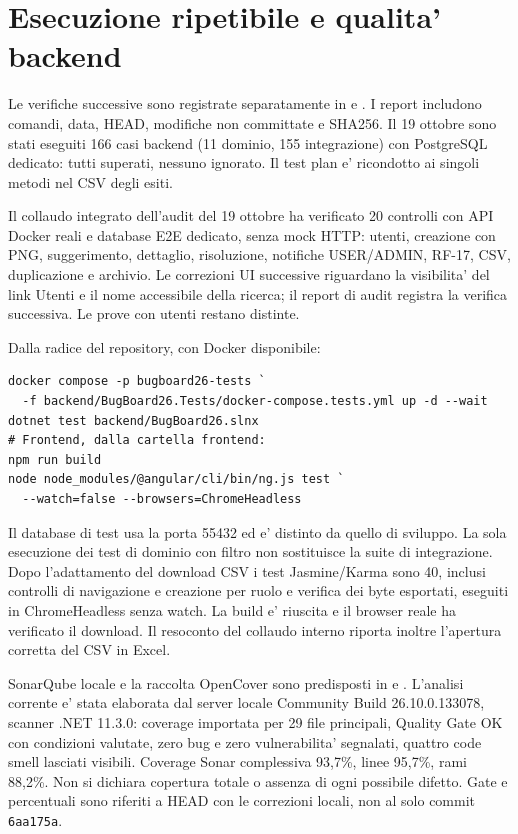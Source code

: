 \documentclass[11pt,a4paper,oneside]{report}
\begin{document}
\section{Esecuzione ripetibile e qualita' backend}
Le verifiche successive sono registrate separatamente in
 e .
I report includono comandi, data, HEAD, modifiche non committate e SHA256.
Il 19 ottobre sono stati eseguiti 166 casi backend (11 dominio, 155 integrazione)
con PostgreSQL dedicato: tutti superati, nessuno ignorato. Il test plan e'
ricondotto ai singoli metodi nel CSV degli esiti.

Il collaudo integrato dell'audit del 19 ottobre ha verificato 20 controlli con API Docker
reali e database E2E dedicato, senza mock HTTP: utenti, creazione con PNG,
suggerimento, dettaglio, risoluzione, notifiche USER/ADMIN, RF-17, CSV,
duplicazione e archivio. Le correzioni UI successive riguardano la visibilita'
del link Utenti e il nome accessibile della ricerca; il report di audit
registra la verifica successiva. Le prove con utenti restano distinte.

Dalla radice del repository, con Docker disponibile:
\par
\begin{minipage}{\textwidth}
\begin{verbatim}
docker compose -p bugboard26-tests `
  -f backend/BugBoard26.Tests/docker-compose.tests.yml up -d --wait
dotnet test backend/BugBoard26.slnx
# Frontend, dalla cartella frontend:
npm run build
node node_modules/@angular/cli/bin/ng.js test `
  --watch=false --browsers=ChromeHeadless
\end{verbatim}
\end{minipage}\par
Il database di test usa la porta 55432 ed e' distinto da quello di sviluppo.
La sola esecuzione dei test di dominio con filtro non sostituisce la suite
di integrazione. Dopo l'adattamento del download CSV i test Jasmine/Karma
sono 40, inclusi controlli di navigazione e creazione per ruolo e verifica
dei byte esportati, eseguiti in ChromeHeadless senza watch. La build e'
riuscita e il browser reale ha verificato il download. Il resoconto del
collaudo interno riporta inoltre l'apertura corretta del CSV in Excel.

SonarQube locale e la raccolta OpenCover sono predisposti in
 e .
L'analisi corrente e' stata elaborata dal server locale Community Build
26.10.0.133078, scanner .NET 11.3.0: coverage importata per 29 file principali,
Quality Gate OK con condizioni valutate, zero bug e zero vulnerabilita'
segnalati, quattro code smell lasciati visibili. Coverage Sonar complessiva
93,7\%, linee 95,7\%, rami 88,2\%. Non si dichiara copertura totale o assenza
di ogni possibile difetto. Gate e percentuali sono riferiti a HEAD con le
correzioni locali, non al solo commit \texttt{6aa175a}.
\end{document}
